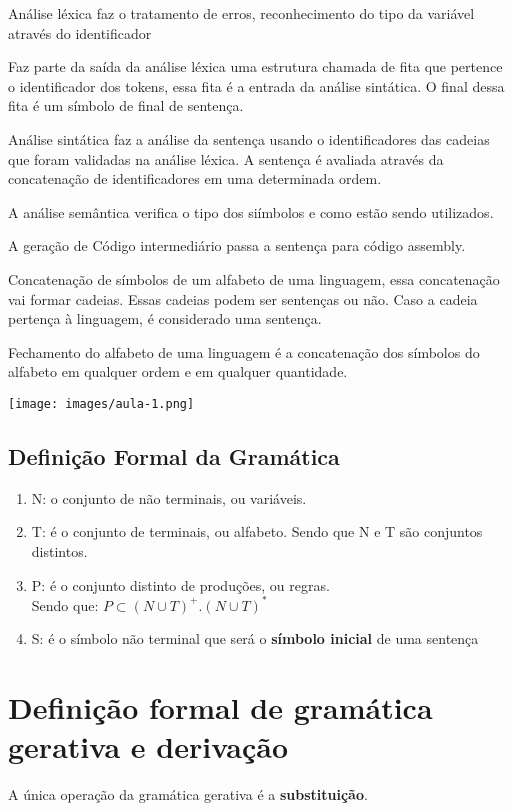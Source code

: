 \documentclass[]{article}
\begin{document}
		Análise léxica faz o tratamento de erros, reconhecimento do tipo da variável através do identificador

		Faz parte da saída da análise léxica uma estrutura chamada de fita que pertence o identificador dos tokens, essa fita é a entrada da análise sintática. O final dessa fita é um símbolo de final de sentença. 

		Análise sintática faz a análise da sentença  usando o identificadores das cadeias que foram validadas na análise léxica. A sentença é avaliada através da concatenação de identificadores em uma determinada ordem.
		
		A análise semântica verifica  o tipo dos siímbolos e como estão sendo utilizados.
		
		A geração de Código intermediário passa a sentença para código assembly.
		
		Concatenação de símbolos de um alfabeto de uma linguagem, essa concatenação vai formar cadeias. Essas cadeias podem ser sentenças ou não. Caso a cadeia pertença à linguagem, é considerado uma sentença.
		
		Fechamento do alfabeto de uma linguagem é a concatenação dos símbolos do alfabeto em qualquer ordem e em qualquer quantidade.
		
		\begin{center}
			\texttt{[image: images/aula-1.png]}		
		\end{center}
		\subsection{Definição Formal da Gramática}
			\begin{enumerate}
				\item N: o conjunto de não terminais, ou variáveis.
				\item T: é o conjunto de terminais, ou alfabeto. Sendo que N e T são conjuntos distintos.
				\item P: é o conjunto distinto de produções, ou regras. \\ Sendo que:
				$P \subset (N \cup T)^{+} . (N \cup T)^{*}$
				\item S: é o símbolo não terminal que será o \textbf{símbolo inicial} de uma sentença %
			\end{enumerate}
	\section{Definição formal de gramática gerativa e derivação}
		A única operação da gramática gerativa é a \textbf{substituição}.
\end{document}
